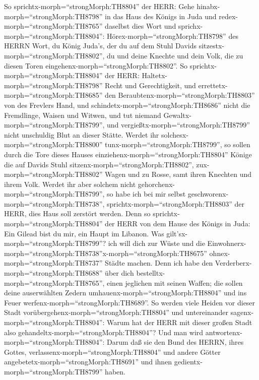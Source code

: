  So sprichtx-morph=``strongMorph:TH8804'' der HERR: Gehe
hinabx-morph=``strongMorph:TH8798'' in das Haus des Königs in Juda und
redex-morph=``strongMorph:TH8765'' daselbst dies Wort  und
sprichx-morph=``strongMorph:TH8804'': Hörex-morph=``strongMorph:TH8798''
des HERRN Wort, du König Juda's, der du auf dem Stuhl Davids
sitzestx-morph=``strongMorph:TH8802'', du und deine Knechte und dein
Volk, die zu diesen Toren eingehenx-morph=``strongMorph:TH8802''.
 So sprichtx-morph=``strongMorph:TH8804'' der HERR:
Haltetx-morph=``strongMorph:TH8798'' Recht und Gerechtigkeit, und
errettetx-morph=``strongMorph:TH8685'' den
Beraubtenx-morph=``strongMorph:TH8803'' von des Frevlers Hand, und
schindetx-morph=``strongMorph:TH8686'' nicht die Fremdlinge, Waisen und
Witwen, und tut niemand Gewaltx-morph=``strongMorph:TH8799'', und
vergießtx-morph=``strongMorph:TH8799'' nicht unschuldig Blut an dieser
Stätte.  Werdet ihr solchesx-morph=``strongMorph:TH8800''
tunx-morph=``strongMorph:TH8799'', so sollen durch die Tore dieses
Hauses einziehenx-morph=``strongMorph:TH8804'' Könige die auf Davids
Stuhl sitzenx-morph=``strongMorph:TH8802'',
zux-morph=``strongMorph:TH8802'' Wagen und zu Rosse, samt ihren Knechten
und ihrem Volk.  Werdet ihr aber solchem nicht
gehorchenx-morph=``strongMorph:TH8799'', so habe ich bei mir selbst
geschworenx-morph=``strongMorph:TH8738'',
sprichtx-morph=``strongMorph:TH8803'' der HERR, dies Haus soll zerstört
werden.  Denn so sprichtx-morph=``strongMorph:TH8804'' der
HERR von dem Hause des Königs in Juda: Ein Gilead bist du mir, ein Haupt
im Libanon. Was gilt'sx-morph=``strongMorph:TH8799''? ich will dich zur
Wüste und die
Einwohnerx-morph=``strongMorph:TH8738''\textbar x-morph=``strongMorph:TH8675''
ohnex-morph=``strongMorph:TH8737'' Städte machen.  Denn ich
habe den Verderberx-morph=``strongMorph:TH8688'' über dich
bestelltx-morph=``strongMorph:TH8765'', einen jeglichen mit seinen
Waffen; die sollen deine auserwählten Zedern
umhauenx-morph=``strongMorph:TH8804'' und ins Feuer
werfenx-morph=``strongMorph:TH8689''.  So werden viele
Heiden vor dieser Stadt vorübergehenx-morph=``strongMorph:TH8804'' und
untereinander sagenx-morph=``strongMorph:TH8804'': Warum hat der HERR
mit dieser großen Stadt also gehandeltx-morph=``strongMorph:TH8804''?
 Und man wird antwortenx-morph=``strongMorph:TH8804'': Darum
daß sie den Bund des HERRN, ihres Gottes,
verlassenx-morph=``strongMorph:TH8804'' und andere Götter
angebetetx-morph=``strongMorph:TH8691'' und ihnen
gedientx-morph=``strongMorph:TH8799'' haben. 
